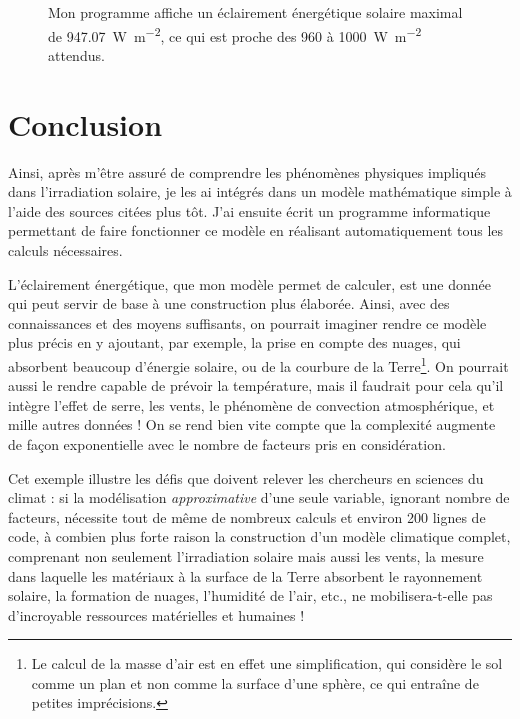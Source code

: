 \documentclass[12pt]{article}
\begin{document}
\begin{figure}[!ht]
  \centering
  \caption{Mon programme affiche un éclairement énergétique solaire maximal de \SI{947.07}{\watt\per\square\meter}, ce qui est proche des 960 à \SI{1000}{\watt\per\square\meter} attendus.}
  \label{fig:maximum}
\end{figure}



\clearpage
\section{Conclusion}

Ainsi, après m'être assuré de comprendre les phénomènes physiques impliqués dans l'irradiation solaire, je les ai intégrés dans un modèle mathématique simple à l'aide des sources citées plus tôt. J'ai ensuite écrit un programme informatique permettant de faire fonctionner ce modèle en réalisant automatiquement tous les calculs nécessaires.

L'éclairement énergétique, que mon modèle permet de calculer, est une donnée qui peut servir de base à une construction plus élaborée.
Ainsi, avec des connaissances et des moyens suffisants, on pourrait imaginer rendre ce modèle plus précis en y ajoutant, par exemple, la prise en compte des nuages, qui absorbent beaucoup d'énergie solaire, ou de la courbure de la Terre\footnote{Le calcul de la masse d'air est en effet une simplification, qui considère le sol comme un plan et non comme la surface d'une sphère, ce qui entraîne de petites imprécisions.}.
On pourrait aussi le rendre capable de prévoir la température, mais il faudrait pour cela qu'il intègre l'effet de serre, les vents, le phénomène de convection atmosphérique, et mille autres données !
On se rend bien vite compte que la complexité augmente de façon exponentielle avec le nombre de facteurs pris en considération.

Cet exemple illustre les défis que doivent relever les chercheurs en sciences du climat : si la modélisation \emph{approximative} d'une seule variable, ignorant nombre de facteurs, nécessite tout de même de nombreux calculs et environ 200 lignes de code, à combien plus forte raison la construction d'un modèle climatique complet, comprenant non seulement l'irradiation solaire mais aussi les vents, la mesure dans laquelle les matériaux à la surface de la Terre absorbent le rayonnement solaire, la formation de nuages, l'humidité de l'air, etc., ne mobilisera-t-elle pas d'incroyable ressources matérielles et humaines !
\end{document}
